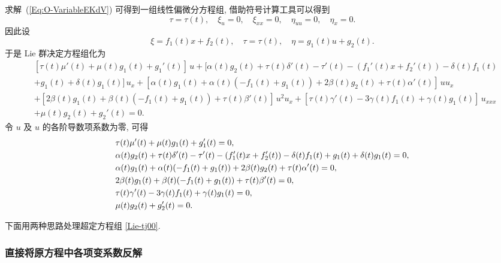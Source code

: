 求解~(\ref{Eq:O-VariableEKdV}) 可得到一组线性偏微分方程组, 借助符号计算工具可以得到
$$\tau=\tau(t),\quad \xi_u=0,\quad \xi_{xx}=0,\quad \eta_{uu}=0,\quad \eta_x=0.$$
因此设
\begin{equation}
\xi=f_1(t) x+f_2(t),\quad \tau=\tau(t),\quad \eta=g_1(t)u+g_2(t).
\end{equation}
于是 Lie 群决定方程组化为
\begin{equation}
\begin{aligned}
  &[\tau(t)\mu'(t)+\mu(t)g_1(t)+g_1'(t)]\,u
  +[\alpha(t)g_2(t)+\tau(t)\delta'(t)
  -\tau'(t)-(f_1'(t)x+f_2'(t))-\delta(t)f_1(t)\\
  &+g_1(t)+\delta(t)g_1(t)]\,u_x
  +[\alpha(t)g_1(t)+\alpha(t)(-f_1(t)+g_1(t))+2\beta(t)g_2(t)+\tau(t)\alpha'(t)]\,uu_x\\
  &+[2\beta(t)g_1(t)+\beta(t)(-f_1(t)+g_1(t))+\tau(t)\beta'(t)]\,u^2u_x
  +[\tau(t)\gamma'(t)-3\gamma(t)f_1(t)+\gamma(t)g_1(t)]\,u_{xxx}\\
  &+\mu(t)g_2(t)+g_2'(t)=0.
\end{aligned}
\end{equation}
令 $u$ 及 $u$ 的各阶导数项系数为零, 可得
\begin{align}\label{Lie-tj00}
  &\tau(t)\mu'(t)+\mu(t)g_1(t)+g_1'(t)=0,\notag\\%
  &\alpha(t)g_2(t)+\tau(t)\delta'(t)-\tau'(t)-(f_1'(t)x+f_2'(t))-\delta(t)f_1(t)+g_1(t)+\delta(t)g_1(t)=0,\notag\\%
  &\alpha(t)g_1(t)+\alpha(t)(-f_1(t)+g_1(t))+2\beta(t)g_2(t)+\tau(t)\alpha'(t)=0,\notag\\%
  &2\beta(t)g_1(t)+\beta(t)(-f_1(t)+g_1(t))+\tau(t)\beta'(t)=0,\notag\\%
  &\tau(t)\gamma'(t)-3\gamma(t)f_1(t)+\gamma(t)g_1(t)=0,\notag\\%
  &\mu(t)g_2(t)+g_2'(t)=0.%
\end{align}

下面用两种思路处理超定方程组 \eqref{Lie-tj00}.

\subsubsection{直接将原方程中各项变系数反解}

